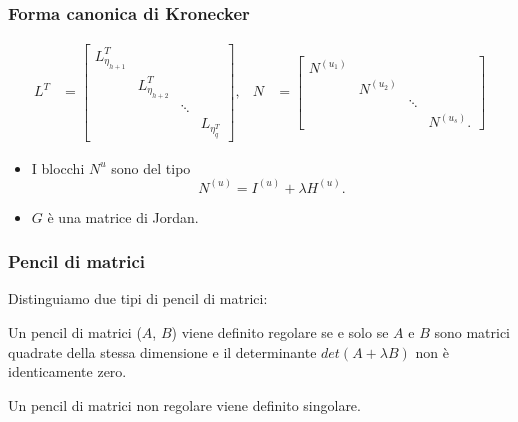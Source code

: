 \begin{frame}
	\frametitle{Forma canonica di Kronecker}
	\begin{align*}
		L^T &= \left[\begin{smallmatrix}
			L_{\eta_{h+1}}^T \\
			& L_{\eta_{h+2}}^T \\
			& & \ddots \\
			& & & L_{\eta_{q}^T}
		\end{smallmatrix}\right], &
		N &= \left[\begin{smallmatrix}
			N^{(u_{1})} \\
			& N^{(u_{2})} \\ 
			& & \ddots \\
			& & & N^{(u_{s})}.
		\end{smallmatrix}\right]
	\end{align*}
	\begin{itemize}
		\item {} I blocchi $N^{u}$ sono del tipo
		\[N^{(u)} = I^{(u)} + \lambda H^{(u)}.\]
		\item {} $G$ \`e una matrice di Jordan.
	\end{itemize}
\end{frame}


\begin{frame}
	\frametitle{Pencil di matrici}
	Distinguiamo due tipi di pencil di matrici:
	\begin{definition}
		Un pencil di matrici ($A$, $B$) viene definito regolare se e solo se
		$A$ e $B$ sono matrici quadrate della stessa dimensione e il determinante
		$det(A+\lambda B)$ non \`e identicamente zero.
	\end{definition}
	\begin{definition}
			Un pencil di matrici non regolare viene definito singolare.
	\end{definition}
\end{frame}